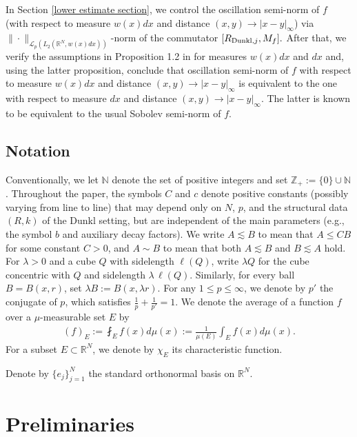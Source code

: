 \documentclass{amsart}
\numberwithin{equation}{section}
\begin{document}
In Section \ref{lower estimate section}, we control the oscillation semi-norm of $f$ (with respect to measure $w(x)dx$ and distance $(x,y)\to|x-y|_{\infty}$) via $\|\cdot\|_{\mathcal{L}_p(L_2(\mathbb{R}^N,w(x)dx))}$-norm of the commutator $[R_{{\rm Dunkl},j},M_f].$ After that, we verify the assumptions in Proposition 1.2 in \cite{Hytonen-new} for measures $w(x)dx$ and $dx$ and, using the latter proposition, conclude that oscillation semi-norm of $f$ with respect to measure $w(x)dx$ and distance $(x,y)\to|x-y|_{\infty}$ is equivalent to the one with respect to measure $dx$ and distance $(x,y)\to|x-y|_{\infty}.$ The latter is known to be equivalent to the usual Sobolev semi-norm of $f.$

\subsection{Notation}
Conventionally, we let $\mathbb{N}$ denote the set of positive integers and set $\mathbb{Z}_+ := \{0\} \cup \mathbb{N}$. Throughout the paper, the symbols $C$ and $c$ denote positive constants (possibly varying from line to line) that may depend only on $N$, $p$, and the structural data $(R,k)$ of the Dunkl setting, but are independent of the main parameters (e.g., the symbol $b$ and auxiliary decay factors).
 We write $A \lesssim B$ to mean that $A \leq C B$ for some constant $C > 0$, and $A \sim B$ to mean that both $A \lesssim B$ and $B \lesssim A$ hold.
For \(\lambda>0\) and a cube \(Q\) with sidelength \(\ell(Q)\), write \(\lambda Q\) for the cube concentric with \(Q\) and sidelength \(\lambda\,\ell(Q)\). Similarly, for every ball \(B=B(x,r)\), set \(\lambda B:=B(x,\lambda r)\). For any $1\leq p\leq\infty$, we denote by $p'$ the conjugate of $p$, which satisfies $\frac{1}{p}+\frac{1}{p'}=1$. We denote the average of a function $f$ over a $\mu$-measurable set $E$ by
\begin{align}\label{defaverage}
(f)_E:=\fint_{E}f(x)d\mu(x):=\frac{1}{\mu(E)}\int_{E}f(x)d\mu(x).
\end{align}
For a subset $E \subset \mathbb{R}^{N}$, we denote by $\chi_E$ its characteristic function.

Denote by $\{e_j\}_{j=1}^N$ the standard orthonormal basis on $\mathbb{R}^N$.


\section{Preliminaries}
\setcounter{equation}{0}
\end{document}
